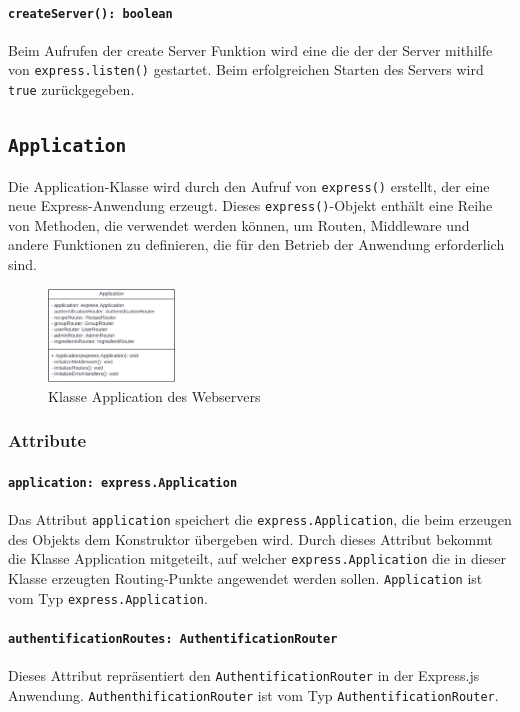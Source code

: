 \documentclass{entwurfsheft}
\begin{document}
\paragraph{\texttt{createServer(): boolean}}
Beim Aufrufen der create Server Funktion wird eine die der der Server mithilfe von \texttt{express.listen()} gestartet. Beim erfolgreichen Starten des Servers wird \texttt{true} zurückgegeben.

\newpage

\subsection{\texttt{Application}}\label{sec:Application}
Die Application-Klasse wird durch den Aufruf von \texttt{express()} erstellt, der eine neue Express-Anwendung erzeugt. Dieses \texttt{express()}-Objekt enthält eine Reihe von Methoden, die verwendet werden können, um Routen, Middleware und andere Funktionen zu definieren, die für den Betrieb der Anwendung erforderlich sind.

\begin{figure}[htp]
    \centering
    \includegraphics[width = 0.3\textwidth]{images/webserver/application.pdf}
    \caption{Klasse Application des Webservers}
    \label{fig:application}
\end{figure}


\subsubsection*{Attribute}
\paragraph{\texttt{application: express.Application}}
Das Attribut \texttt{application} speichert die \newline
\texttt{express.Application}, die beim erzeugen des Objekts dem Konstruktor übergeben wird.
Durch dieses Attribut bekommt die Klasse Application mitgeteilt, auf welcher \texttt{express.Application} die in dieser Klasse erzeugten Routing-Punkte angewendet werden sollen.
\texttt{Application} ist vom Typ \texttt{express.Application}.
\paragraph{\texttt{authentificationRoutes: AuthentificationRouter}}
Dieses Attribut repräsentiert den \newline
\texttt{AuthentificationRouter} in der Express.js Anwendung. \texttt{AuthenthificationRouter} ist vom Typ \texttt{AuthentificationRouter}.
\end{document}
